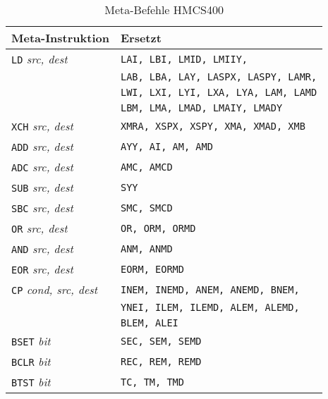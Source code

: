 \documentclass[12pt,a4paper,twoside]{report}
\newcommand{\tty}[1]{{\tt #1}}
\begin{document}
{\begin{table*}
\begin{center}\begin{tabular}{|l|l|}
\hline
Meta-Instruktion          & Ersetzt \\
\hline
\tty{LD} {\em src, dest}        & \tty{LAI, LBI, LMID, LMIIY,} \\
                                & \tty{LAB, LBA, LAY, LASPX, LASPY, LAMR,} \\
                                & \tty{LWI, LXI, LYI, LXA, LYA, LAM, LAMD} \\
                                & \tty{LBM, LMA, LMAD, LMAIY, LMADY} \\
\tty{XCH} {\em src, dest}       & \tty{XMRA, XSPX, XSPY, XMA, XMAD, XMB} \\
\tty{ADD} {\em src, dest}       & \tty{AYY, AI, AM, AMD} \\
\tty{ADC} {\em src, dest}       & \tty{AMC, AMCD} \\
\tty{SUB} {\em src, dest}       & \tty{SYY} \\
\tty{SBC} {\em src, dest}       & \tty{SMC, SMCD} \\
\tty{OR}  {\em src, dest}       & \tty{OR, ORM, ORMD} \\
\tty{AND} {\em src, dest}       & \tty{ANM, ANMD} \\
\tty{EOR} {\em src, dest}       & \tty{EORM, EORMD} \\
\tty{CP}  {\em cond, src, dest} & \tty{INEM, INEMD, ANEM, ANEMD, BNEM,} \\
                                & \tty{YNEI, ILEM, ILEMD, ALEM, ALEMD,} \\
                                & \tty{BLEM, ALEI} \\
\tty{BSET} {\em bit}            & \tty{SEC, SEM, SEMD} \\
\tty{BCLR} {\em bit}            & \tty{REC, REM, REMD} \\
\tty{BTST} {\em bit}            & \tty{TC, TM, TMD} \\
\hline
\end{tabular}\end{center}
\caption{Meta-Befehle HMCS400}
\label{TabHMCS400Meta}
\end{table*}

}
\end{document}
